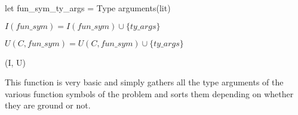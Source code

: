 \documentclass[]{ceurart}
\begin{document}
\begin{algorithm}[tbh]
\begin{algorithmic}[1]
         \State let fun\_sym\_ty\_args = Type arguments(lit)

            \State \(I(fun\_sym) = I(fun\_sym) \cup \{ty\_args\}\)

         \Else

            \State \(U(C, fun\_sym) = U(C, fun\_sym) \cup \{ty\_args\}\)

         \EndIf
         \EndFor
      \EndFor
   \EndFor

   \State \Return (I, U)

\EndFunction
\end{algorithmic}
\end{algorithm}

This function is very basic and simply gathers all the type arguments of the various function symbols of the problem and sorts them depending on whether they are ground or not.
\end{document}
